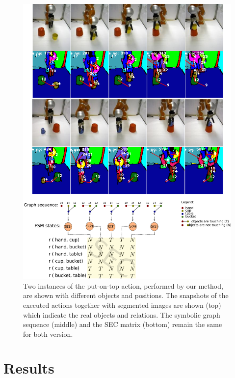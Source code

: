 \begin{figure}
      \centering
      \includegraphics[scale=0.20]{./pdf/result_puton.pdf}
      \caption{ Two instances of the put-on-top action, performed by our method, are shown with different objects and positions. 
The snapshots of the executed actions together with segmented images are shown (top) which indicate the real objects and relations.
The symbolic graph sequence (middle) and the SEC matrix (bottom) remain the same for both version.
}
      \label{fig:result_puton}
\end{figure}
\section{Results}
\label{sec:results}

